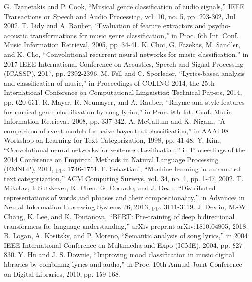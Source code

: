 \documentclass[conference]{IEEEtran}
\begin{document}
\begin{thebibliography}{00}
 G. Tzanetakis and P. Cook, ``Musical genre classification of audio signals,'' IEEE Transactions on Speech and Audio Processing, vol. 10, no. 5, pp. 293-302, Jul 2002.
 T. Lidy and A. Rauber, ``Evaluation of feature extractors and psycho-acoustic transformations for music genre classification,'' in Proc. 6th Int. Conf. Music Information Retrieval, 2005, pp. 34-41.
 K. Choi, G. Fazekas, M. Sandler, and K. Cho, ``Convolutional recurrent neural networks for music classification,'' in 2017 IEEE International Conference on Acoustics, Speech and Signal Processing (ICASSP), 2017, pp. 2392-2396.
 M. Fell and C. Sporleder, ``Lyrics-based analysis and classification of music,'' in Proceedings of COLING 2014, the 25th International Conference on Computational Linguistics: Technical Papers, 2014, pp. 620-631.
 R. Mayer, R. Neumayer, and A. Rauber, ``Rhyme and style features for musical genre classification by song lyrics,'' in Proc. 9th Int. Conf. Music Information Retrieval, 2008, pp. 337-342.
 A. McCallum and K. Nigam, ``A comparison of event models for naive bayes text classification,'' in AAAI-98 Workshop on Learning for Text Categorization, 1998, pp. 41-48.
 Y. Kim, ``Convolutional neural networks for sentence classification,'' in Proceedings of the 2014 Conference on Empirical Methods in Natural Language Processing (EMNLP), 2014, pp. 1746-1751.
 F. Sebastiani, ``Machine learning in automated text categorization,'' ACM Computing Surveys, vol. 34, no. 1, pp. 1-47, 2002.
 T. Mikolov, I. Sutskever, K. Chen, G. Corrado, and J. Dean, ``Distributed representations of words and phrases and their compositionality,'' in Advances in Neural Information Processing Systems 26, 2013, pp. 3111-3119.
 J. Devlin, M.-W. Chang, K. Lee, and K. Toutanova, ``BERT: Pre-training of deep bidirectional transformers for language understanding,'' arXiv preprint arXiv:1810.04805, 2018.
 B. Logan, A. Kositsky, and P. Moreno, ``Semantic analysis of song lyrics,'' in 2004 IEEE International Conference on Multimedia and Expo (ICME), 2004, pp. 827-830.
 Y. Hu and J. S. Downie, ``Improving mood classification in music digital libraries by combining lyrics and audio,'' in Proc. 10th Annual Joint Conference on Digital Libraries, 2010, pp. 159-168.
\end{thebibliography}
\end{document}
